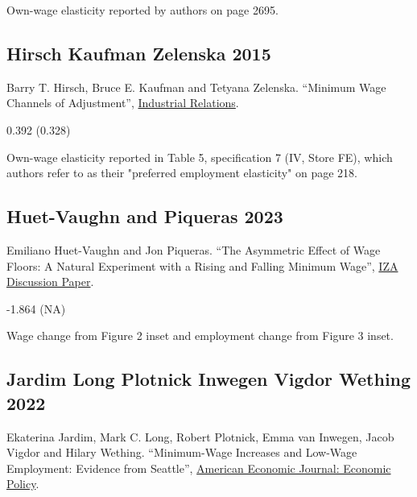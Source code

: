 \vspace{0.7em}

 Own-wage elasticity reported by authors on page 2695.

\subsection*{Hirsch Kaufman Zelenska 2015}
\vspace{-0.7em}

\noindent Barry T. Hirsch, Bruce E. Kaufman and Tetyana Zelenska. ``Minimum Wage Channels of Adjustment'', \href{https://doi.org/10.1111/irel.12091}{Industrial Relations}.

\vspace{0.7em}

 0.392 (0.328)

\vspace{0.7em}

 Own-wage elasticity reported in Table 5, specification 7 (IV, Store FE), which authors refer to as their "preferred employment elasticity" on page 218.

\subsection*{Huet-Vaughn and Piqueras 2023}
\vspace{-0.7em}

\noindent Emiliano Huet-Vaughn and Jon Piqueras. ``The Asymmetric Effect of Wage Floors: A Natural Experiment with a Rising and Falling Minimum Wage'', \href{https://docs.iza.org/dp16684.pdf}{IZA Discussion Paper}.

\vspace{0.7em}

 -1.864 (NA)

\vspace{0.7em}

 Wage change from Figure 2 inset and employment change from Figure 3 inset.

\subsection*{Jardim Long Plotnick Inwegen Vigdor Wething 2022}
\vspace{-0.7em}

\noindent Ekaterina Jardim, Mark C. Long, Robert Plotnick, Emma van Inwegen, Jacob Vigdor and Hilary Wething. ``Minimum-Wage Increases and Low-Wage Employment: Evidence from Seattle'', \href{https://doi.org/10.1257/pol.20180578}{American Economic Journal: Economic Policy}.

